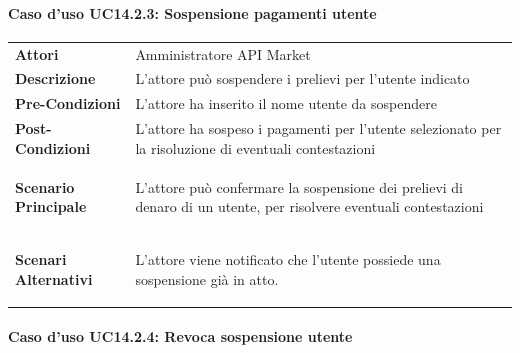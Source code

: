 \paragraph{Caso d'uso UC14.2.3: Sospensione pagamenti utente}
\label{UC14_2_3}

\begin{minipage}{\linewidth}
	\begin{tabular}{ l | p{11cm}}
		\hline
		\rowcolor{Gray}
		\multicolumn{2}{c}{UC14.2.3 - Sospensione pagamenti utente} \\
		\hline
		\textbf{Attori} & Amministratore API Market \\
		\textbf{Descrizione} & L'attore può sospendere i prelievi per l'utente indicato \\
		\textbf{Pre-Condizioni} & L'attore ha inserito il nome utente da sospendere\\
		\textbf{Post-Condizioni} & L'attore ha sospeso i pagamenti per l'utente selezionato per la risoluzione di eventuali contestazioni \\
		\textbf{Scenario Principale} & 
		\begin{enumerate*}[label=(\arabic*.),itemjoin={\newline}]
			\item L'attore può confermare la sospensione dei prelievi di denaro di un utente, per risolvere eventuali contestazioni
		\end{enumerate*}\\
		\textbf{Scenari Alternativi} & 
		\begin{enumerate*}[label=(\arabic*.),itemjoin={\newline}]
			\item L'attore viene notificato che l'utente possiede una sospensione già in atto.
		\end{enumerate*}\\
	\end{tabular}
\end{minipage}

\paragraph{Caso d'uso UC14.2.4: Revoca sospensione utente}
\label{UC14_2_4}

